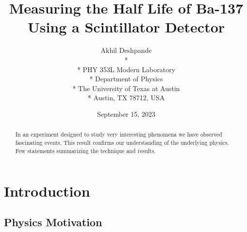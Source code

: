 \documentclass[10pt,letterpaper,onecolumn]{article}
\begin{document}

\title{\Large\bf Measuring the Half Life of Ba-137 Using a Scintillator Detector}

\author{
 Akhil Deshpande \\*
  \\*
 PHY 353L Modern Laboratory \\*
 Department of Physics \\*
 The University of Texas at Austin \\*
 Austin, TX 78712, USA
}
\date{September 15, 2023}


\maketitle


\begin{abstract}

In an experiment designed to study very interesting phenomena
we have observed fascinating events.
This result confirms our understanding of the underlying physics.
Few statements summarizing the technique and results.

\end{abstract}



\section{Introduction}

\subsection{Physics Motivation}
\end{document}
